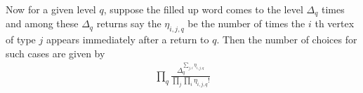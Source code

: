\documentclass[12pt]{article}
\numberwithin{equation}{section}
\numberwithin{equation}{section}
\theoremstyle{definition}
\renewcommand{\1}{\bf 1}
\begin{document}
 

 
Now for a given level $q$, suppose the filled up word comes to the level $\Delta_{q}$ times and among these $\Delta_{q}$ returns say the $\eta_{i,j,q}$ be the number of times the $i$ th vertex of type $j$ appears immediately after a return to $q$. Then the number of choices for such cases are given by 
\begin{equation}
\begin{split}
\prod_{q} \frac{\Delta_{q}^{\sum_{j,i}\eta_{i,j,q} }}{\prod_{j}\prod_{i}\eta_{i,j,q}!}
\end{split}
\end{equation}

\end{document}
